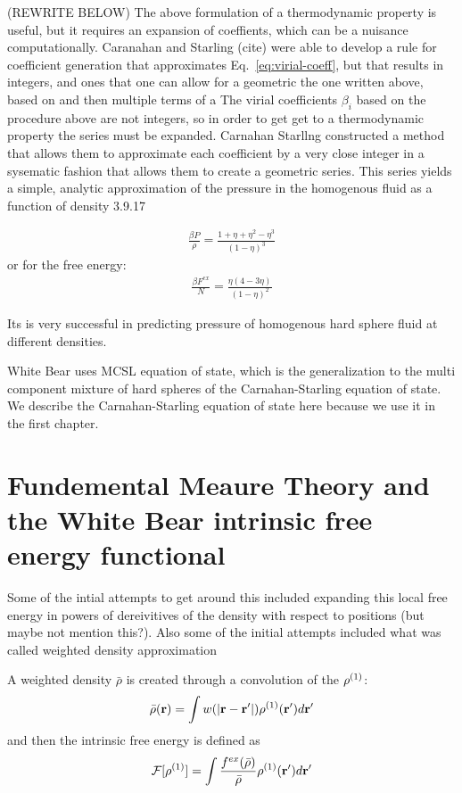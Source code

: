 (REWRITE BELOW)
The above formulation of a thermodynamic property is useful, but it
requires an expansion of coeffients, which can be a nuisance
computationally.  Caranahan and Starling (cite) were able to develop a
rule for coefficient generation that approximates
Eq.~\ref{eq:virial-coeff}, but that results in integers, and ones that
one can allow for a geometric the one written above, based on and then
multiple terms of a The virial coefficients $\beta_i$ based on the
procedure above are not integers, so in order to get get to a
thermodynamic property the series must be expanded.  Carnahan Starllng
constructed a method that allows them to approximate each coefficient
by a very close integer in a sysematic fashion that allows them to
create a geometric series.  This series yields a simple, analytic
approximation of the pressure in the homogenous fluid as a function of
density 3.9.17


\begin{align}
  \frac{\beta P}{\rho}=\frac{1+\eta+\eta^2-\eta^3}{(1-\eta)^3}
\end{align}
or for the free energy:
\begin{align}
  \frac{\beta F^{ex}}{N}=\frac{\eta(4-3\eta)}{(1-\eta)^2}
\end{align}

Its is very successful in predicting pressure of homogenous hard
sphere fluid at different densities.

White Bear uses MCSL equation of state, which is the generalization to
the multi component mixture of hard spheres of the Carnahan-Starling
equation of state.  We describe the Carnahan-Starling equation of
state here because we use it in the first chapter.





\section{Fundemental Meaure Theory and the White Bear intrinsic free energy functional}

Some of the intial attempts to get around this included expanding
this local free energy in powers of dereivitives of the density with
respect to positions (but maybe not mention this?).  Also some of
the initial attempts included what was called weighted density
approximation

A weighted density $\bar{\rho}$ is created through a convolution of
the $\rho^{(1)}$:
\begin{align}
  \bar{\rho}(\textbf{r}) = \int w(|\textbf{r}-\textbf{r}'|) \rho^{(1)}(\textbf{r}') d\textbf{r}'
\end{align}
and then the intrinsic free energy is defined as
\begin{align}
  \mathcal{F}[\rho^{(1)}] = \int \frac{f^{ex}(\bar{\rho})}{\bar{\rho}} \rho^{(1)}(\textbf{r}') d\textbf{r}'
\end{align}



